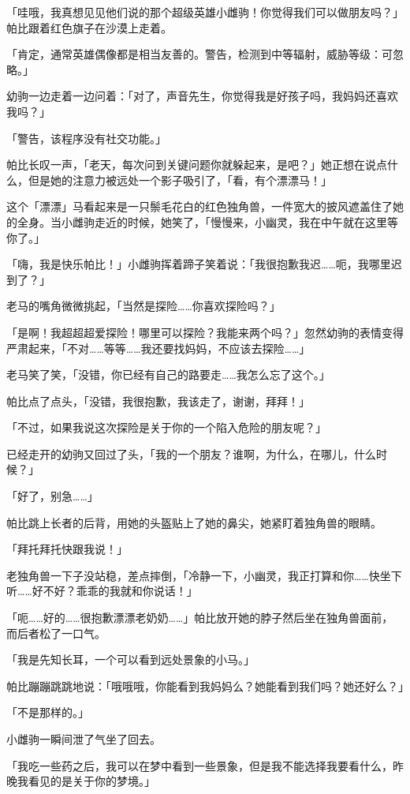 \horizonline

「哇哦，我真想见见他们说的那个超级英雄小雌驹！你觉得我们可以做朋友吗？」帕比跟着红色旗子在沙漠上走着。

「{\mt 肯定，通常英雄偶像都是相当友善的。警告，检测到中等辐射，威胁等级：可忽略。}」

幼驹一边走着一边问着：「对了，声音先生，你觉得我是好孩子吗，我妈妈还喜欢我吗？」

「{\mt 警告，该程序没有社交功能。}」

帕比长叹一声，「老天，每次问到关键问题你就躲起来，是吧？」她正想在说点什么，但是她的注意力被远处一个影子吸引了，「看，有个漂漂马！」

这个「漂漂」马看起来是一只鬃毛花白的红色独角兽，一件宽大的披风遮盖住了她的全身。当小雌驹走近的时候，她笑了，「慢慢来，小幽灵，我在中午就在这里等你了。」

「嗨，我是快乐帕比！」小雌驹挥着蹄子笑着说：「我很抱歉我迟……呃，我哪里迟到了？」

老马的嘴角微微挑起，「当然是探险……你喜欢探险吗？」

「是啊！我超超超爱探险！哪里可以探险？我能来两个吗？」忽然幼驹的表情变得严肃起来，「不对……等等……我还要找妈妈，不应该去探险……」

老马笑了笑，「没错，你已经有自己的路要走……我怎么忘了这个。」

帕比点了点头，「没错，我很抱歉，我该走了，谢谢，拜拜！」

「不过，如果我说这次探险是关于你的一个陷入危险的朋友呢？」

已经走开的幼驹又回过了头，「我的一个朋友？谁啊，为什么，在哪儿，什么时候？」

「好了，别急……」

帕比跳上长者的后背，用她的头盔贴上了她的鼻尖，她紧盯着独角兽的眼睛。

「拜托拜托快跟我说！」

老独角兽一下子没站稳，差点摔倒，「冷静一下，小幽灵，我正打算和你……快坐下听……好不好？乖乖的我就和你说话！」

「呃……好的……很抱歉漂漂老奶奶……」帕比放开她的脖子然后坐在独角兽面前，而后者松了一口气。

「我是先知长耳，一个可以看到远处景象的小马。」

帕比蹦蹦跳跳地说：「哦哦哦，你能看到我妈妈么？她能看到我们吗？她还好么？」

「不是那样的。」

小雌驹一瞬间泄了气坐了回去。

「我吃一些药之后，我可以在梦中看到一些景象，但是我不能选择我要看什么，昨晚我看见的是关于你的梦境。」

